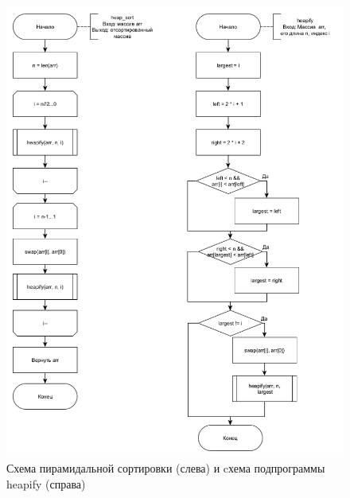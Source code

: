 \begin{figure}[h]
	\centering
	\includegraphics[scale = 0.5]{img/heap_diag.png}
	\caption{Схема пирамидальной сортировки (слева) и cхема подпрограммы heapify (справа)}
	\label{fig:heap_d}
\end{figure}
\clearpage
